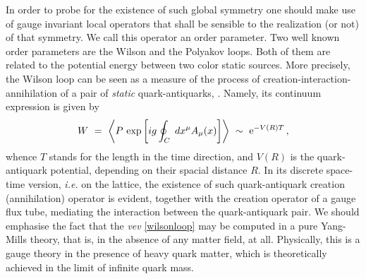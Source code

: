 In order to probe for the existence of such global symmetry one should make use of gauge
invariant local operators that shall be sensible to the realization (or not) of that
symmetry. We call this operator an order parameter. Two well known order parameters are the
Wilson and the Polyakov loops. Both of them are related to the potential energy between two
color static sources. More precisely, the Wilson loop can be seen as a measure of the 
process of creation-interaction-annihilation of a pair of \emph{static} quark-antiquarks,
\cite{Wilson:1974sk}. Namely, its continuum expression is given by \cite{Greensite:2011zz}
\begin{eqnarray}
W ~=~ \left\langle P\,\exp\left[ig \oint_{C}\;dx^{\mu}A_{\mu}(x)\right]  \right\rangle ~\sim~
\mathrm{e}^{-V(R)T}\,,
\label{wilsonloop}
\end{eqnarray}
whence $T$ stands for the length in the time direction, and $V(R)$ is the quark-antiquark
potential, depending on their spacial distance $R$. In its discrete space-time version,
\emph{i.e.} on the lattice, the existence of such quark-antiquark creation (annihilation)
operator is evident, together with the creation operator of a gauge flux tube, mediating the
interaction between the quark-antiquark pair. We should emphasise the fact that the
\emph{vev} \eqref{wilsonloop} may be computed in a pure Yang-Mills theory, that is, in the
absence of any matter field, at all. Physically, this is a gauge theory in the presence of
heavy quark matter, which is theoretically achieved in the limit of infinite quark mass.

